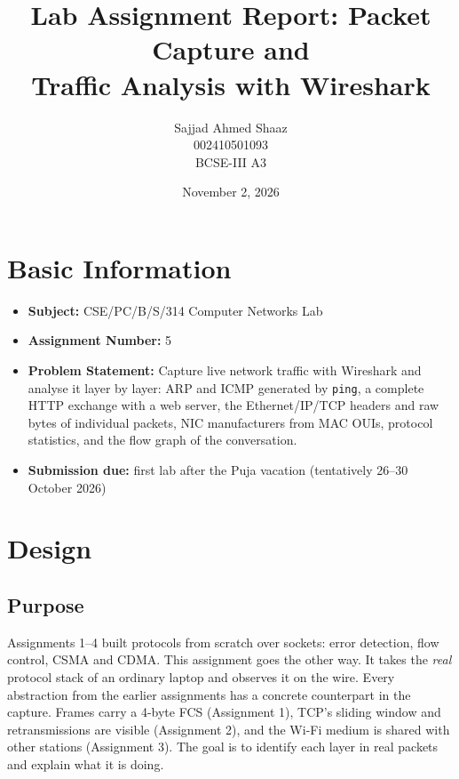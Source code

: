 \documentclass[11pt]{article}
\title{\Large\textbf{Lab Assignment Report: Packet Capture and\\ Traffic Analysis with Wireshark}}
\author{Sajjad Ahmed Shaaz \\ 002410501093 \\ BCSE-III A3}
\date{November 2, 2026}
\begin{document}
\maketitle

\section*{Basic Information}
\begin{itemize}[leftmargin=1.6em]
  \item \textbf{Subject:} CSE/PC/B/S/314 Computer Networks Lab
  \item \textbf{Assignment Number:} 5
  \item \textbf{Problem Statement:} Capture live network traffic with Wireshark and analyse
  it layer by layer: ARP and ICMP generated by \texttt{ping}, a complete HTTP exchange with a
  web server, the Ethernet/IP/TCP headers and raw bytes of individual packets, NIC
  manufacturers from MAC OUIs, protocol statistics, and the flow graph of the conversation.
  \item \textbf{Submission due:} first lab after the Puja vacation (tentatively 26--30
  October 2026)
\end{itemize}

\section{Design}

\subsection{Purpose}
Assignments 1--4 built protocols from scratch over sockets: error detection, flow control,
CSMA and CDMA. This assignment goes the other way. It takes the \emph{real} protocol stack
of an ordinary laptop and observes it on the wire. Every abstraction from the earlier
assignments has a concrete counterpart in the capture. Frames carry a 4-byte FCS (Assignment 1),
TCP's sliding window and retransmissions are visible (Assignment 2), and the Wi-Fi medium is
shared with other stations (Assignment 3). The goal is to identify each layer in real packets
and explain what it is doing.
\end{document}

